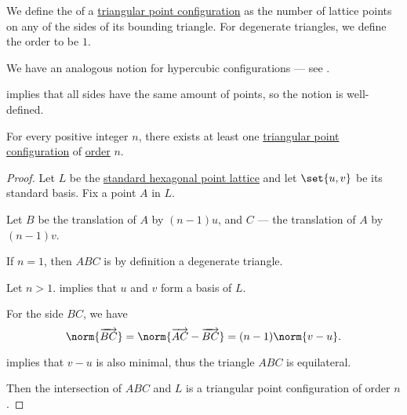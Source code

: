 \begin{definition}\label{def:triangular_point_configuration_order}\mimprovised
  We define the  of a \hyperref[def:triangular_point_configuration]{triangular point configuration} as the number of lattice points on any of the sides of its bounding triangle. For degenerate triangles, we define the order to be \( 1 \).
\end{definition}
\begin{comments}
  \item We have an analogous notion for hypercubic configurations --- see .
\end{comments}
\begin{defproof}
   implies that all sides have the same amount of points, so the notion is well-defined.
\end{defproof}

\begin{proposition}\label{thm:triangular_point_configuration_existence}
  For every positive integer \( n \), there exists at least one \hyperref[def:triangular_point_configuration]{triangular point configuration} of \hyperref[def:triangular_point_configuration_order]{order} \( n \).
\end{proposition}
\begin{proof}
  Let \( L \) be the \hyperref[def:hexagonal_point_lattice]{standard hexagonal point lattice} and let \( \set{ u, v } \) be its standard basis. Fix a point \( A \) in \( L \).

  Let \( B \) be the translation of \( A \) by \( (n - 1)u \), and \( C \) --- the translation of \( A \) by \( (n - 1)v \).

  If \( n = 1 \), then \( ABC \) is by definition a degenerate triangle.

  Let \( n > 1 \).  implies that \( u \) and \( v \) form a basis of \( L \).

  For the side \( BC \), we have
  \begin{equation*}
    \norm{\vect{BC}} = \norm{\vect{AC} - \vect{BC}} = (n - 1) \norm{v - u}.
  \end{equation*}

   implies that \( v - u \) is also minimal, thus the triangle \( ABC \) is equilateral.

  Then the intersection of \( ABC \) and \( L \) is a triangular point configuration of order \( n \).
\end{proof}

